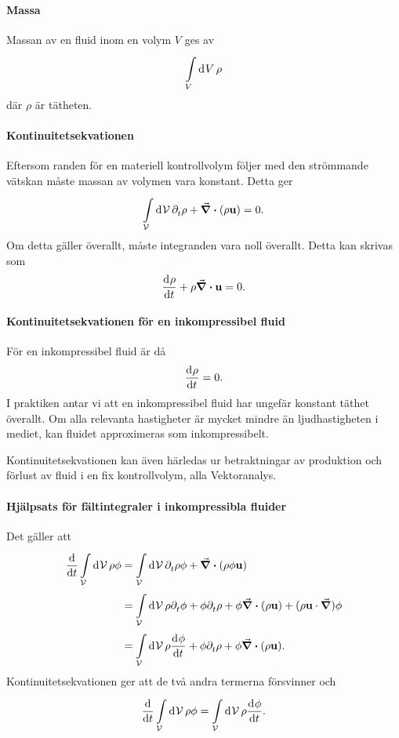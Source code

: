 \paragraph{Massa}
Massan av en fluid inom en volym $V$ ges av
\begin{align*}
	\int\limits_{V}^{}\dd[]{V}\rho
\end{align*}
där $\rho$ är tätheten.

\paragraph{Kontinuitetsekvationen}
Eftersom randen för en materiell kontrollvolym följer med den strömmande vätskan måste massan av volymen vara konstant. Detta ger
\begin{align*}
	\int\limits_{\mathcal{V}}^{}\dd[]{\mathcal{V}}\partial_{t}^{}\rho + \div(\rho\vb{u}) = 0.
\end{align*}
Om detta gäller överallt, måste integranden vara noll överallt. Detta kan skrivas som
\begin{align*}
	\dv[]{\rho}{t} + \rho\div{\vb{u}} = 0.
\end{align*}

\paragraph{Kontinuitetsekvationen för en inkompressibel fluid}
För en inkompressibel fluid är då
\begin{align*}
	\dv[]{\rho}{t} = 0.
\end{align*}
I praktiken antar vi att en inkompressibel fluid har ungefär konstant täthet överallt. Om alla relevanta hastigheter är mycket mindre än ljudhastigheten i mediet, kan fluidet approximeras som inkompressibelt.

Kontinuitetsekvationen kan även härledas ur betraktningar av produktion och förlust av fluid i en fix kontrollvolym, alla Vektoranalys.

\paragraph{Hjälpsats för fältintegraler i inkompressibla fluider}
Det gäller att
\begin{align*}
	\dv{t}\int\limits_{\mathcal{V}}^{}\dd[]{\mathcal{V}}\rho\phi &= \int\limits_{\mathcal{V}}^{}\dd[]{\mathcal{V}}\partial_{t}^{}\rho\phi + \div(\rho\phi\vb{u}) \\
	                                               &= \int\limits_{\mathcal{V}}^{}\dd[]{\mathcal{V}}\rho\partial_{t}^{}\phi + \phi\partial_{t}^{}\rho + \phi\div(\rho\vb{u}) + (\rho\vb{u}\cdot\grad)\phi \\
	                                               &= \int\limits_{\mathcal{V}}^{}\dd[]{\mathcal{V}}\rho\dv[]{\phi}{t} + \phi\partial_{t}^{}\rho + \phi\div(\rho\vb{u}).
\end{align*}
Kontinuitetsekvationen ger att de två andra termerna försvinner och
\begin{align*}
	\dv{t}\int\limits_{\mathcal{V}}^{}\dd[]{\mathcal{V}}\rho\phi =\int\limits_{\mathcal{V}}^{}\dd[]{\mathcal{V}}\rho\dv[]{\phi}{t}.
\end{align*}

